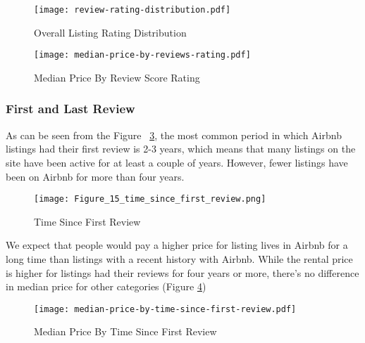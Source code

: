 \begin{figure}[H]\centering
    \texttt{[image: review-rating-distribution.pdf]}
    \caption{Overall Listing Rating Distribution}
    \label{fig:overall-listing}
\end{figure}

\begin{figure}[H]\centering
    \texttt{[image: median-price-by-reviews-rating.pdf]}
    \caption{Median Price By Review Score Rating}
    \label{fig:price_by_review_score_rating}
\end{figure}

\subsubsection*{First and Last Review}

As can be seen from the Figure ~\ref{fig:time_since_first_review}, the most
common period in which  Airbnb listings had their first review is 2-3 years,
which means that many listings on the site have been active for at least a
couple of years. However,  fewer listings have been on Airbnb for more than four
years.

\begin{figure}[H]\centering
    \texttt{[image: Figure\_15\_time\_since\_first\_review.png]}
    \caption{Time Since First Review}
    \label{fig:time_since_first_review}
\end{figure}

We expect that people would pay a higher price for listing lives in Airbnb for a
long time than listings with a recent history with Airbnb.
While the rental price is higher for listings had their reviews for four years
or more, there's no difference in median price for other categories
(Figure \ref{fig:time_since_first_review_price})

\begin{figure}[H]\centering
    \texttt{[image: median-price-by-time-since-first-review.pdf]}
    \caption{Median Price By Time Since First Review}
    \label{fig:time_since_first_review_price}
\end{figure}


